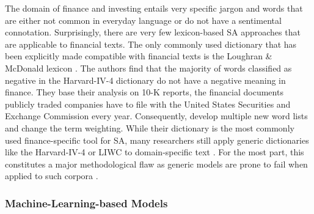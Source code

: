 The domain of finance and investing entails very specific jargon and words that are either not common in everyday language or do not have a sentimental connotation. Surprisingly, there are very few lexicon-based SA approaches that are applicable to financial texts. The only commonly used dictionary that has been explicitly made compatible with financial texts is the Loughran \& McDonald lexicon \cite{loughranMcD2011}. The authors find that the majority of words classified as negative in the Harvard-IV-4 dictionary  do not have a negative meaning in finance. They base their analysis on 10-K reports, the financial documents publicly traded companies have to file with the United States Securities and Exchange Commission every year. Consequently,  develop multiple new word lists and change the term weighting. While their dictionary is the most commonly used finance-specific tool for SA, many researchers still apply generic dictionaries like the Harvard-IV-4 or LIWC to domain-specific text . For the most part, this constitutes a major methodological flaw as generic models are prone to fail when applied to such corpora .


\subsubsection{Machine-Learning-based Models}


